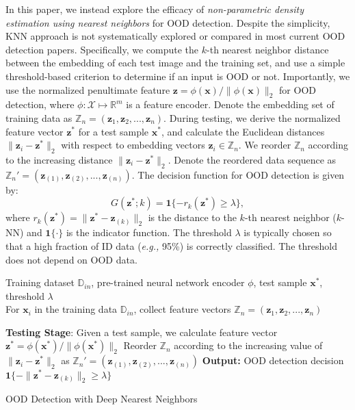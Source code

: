 \documentclass[nohyperref]{article}
\newcommand{\bx}{\mathbf{x}}
\newcommand{\bz}{\mathbf{z}}
\theoremstyle{plain}
\theoremstyle{definition}
\theoremstyle{remark}
\begin{document}
In this paper, we instead explore the efficacy of \emph{non-parametric density estimation using nearest neighbors} for OOD detection. Despite the simplicity, KNN approach is not systematically explored or compared in most
current OOD detection papers. Specifically, we compute the  $k$-th nearest neighbor distance between the
embedding of each test image and the training set, and use
a simple threshold-based criterion to determine if an input
is OOD or not. Importantly, we use the normalized penultimate feature $\bz= \phi(\bx) / \lVert \phi(\bx) \rVert_2$ for OOD detection, where $\phi: \mathcal{X} \mapsto \mathbb{R}^{m}$ is a feature encoder. Denote the embedding set of training data as $\mathbb{Z}_n = (\bz_1, \bz_2, ..., \bz_n )$. During testing, we derive the normalized feature vector $\bz^*$ for a test sample $\bx^*$, and calculate the Euclidean distances $\lVert\bz_i - \bz^*\rVert_2$ with respect to embedding vectors $\bz_i \in \mathbb{Z}_n$. We reorder $\mathbb{Z}_n$ according to the increasing distance $\lVert\bz_i - \bz^*\rVert_2$. 
Denote the reordered data sequence as $\mathbb{Z}_n' = (\bz_{(1)}, \bz_{(2)}, ..., \bz_{(n)})$. The decision function for OOD detection is given by: 
\begin{equation*}
    G(\bz^*;k) = \mathbf{1}\{-r_k(\bz^*) \ge \lambda\},
\end{equation*} 
where $r_k(\bz^*) = \lVert\bz^* - \bz_{(k)}\rVert_2$ is the distance to the $k$-th nearest neighbor ($k$-NN) and $\mathbf{1}\{\cdot\}$ is the indicator function. The threshold $\lambda$ is typically chosen so that a high fraction of ID data (\emph{e.g.,} 95\%) is correctly classified. The threshold does not depend on OOD data.


\begin{algorithm}[t]
\begin{algorithmic}
    Training dataset $\mathbb{D}_{in}$, pre-trained neural network encoder $\phi$, test sample $\bx^*$, threshold $\lambda$\\
   
   \STATE For $\bx_i$ in the training data $\mathbb{D}_{in}$,  collect feature vectors $\mathbb{Z}_n = (\bz_1, \bz_2, ..., \bz_n )$

   \STATE \textbf{Testing Stage}: 
        \STATE Given a test sample, we calculate feature vector $\bz^* = \phi(\bx^*) / \lVert \phi(\bx^*) \rVert_2$
\STATE Reorder $\mathbb{Z}_n$ according to the increasing value of $\lVert\bz_i - \bz^*\rVert_2$ as $\mathbb{Z}_n' = (\bz_{(1)}, \bz_{(2)}, ..., \bz_{(n)})$
    \STATE \textbf{Output: } OOD detection decision $\mathbf{1}\{-\lVert\bz^* - \bz_{(k)}\rVert_2 \ge \lambda\}$
\end{algorithmic}
\caption{OOD Detection with Deep Nearest Neighbors}
\label{alg}
\end{algorithm}
\end{document}
